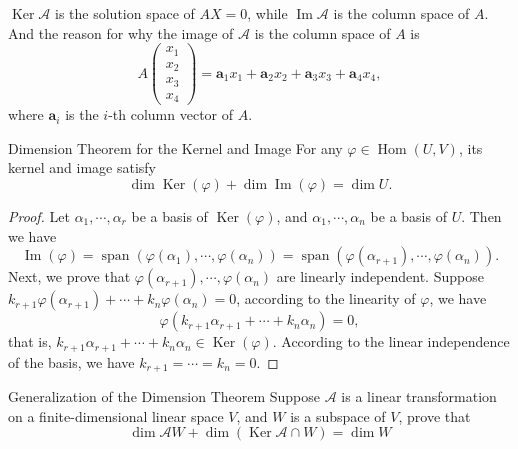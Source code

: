 \begin{solution}
  $\operatorname{Ker} \mathcal{A}$ is the solution space of $AX = 0$,
  while $\operatorname{Im} \mathcal{A}$ is the column space of $A$.
  And the reason for why the image of $\mathcal{A}$ is the column space of $A$ is
  \begin{equation}
    A \left(
      \begin{array}{c}
        x_1\\
        x_2\\
        x_3\\
        x_4
      \end{array}
    \right) = \mathbf{a}_1x_1 + \mathbf{a}_2x_2 + \mathbf{a}_3x_3 + \mathbf{a}_4x_4,
  \end{equation}
  where $\mathbf{a}_i$ is the $i$-th column vector of $A$.
\end{solution}

\begin{theorem}{Dimension Theorem for the Kernel and Image}{}
  For any $\varphi \in \operatorname{Hom}(U, V)$,
  its kernel and image satisfy
  \begin{equation}
    \dim \operatorname{Ker} (\varphi) + \dim \operatorname{Im} (\varphi)
    = \dim U.
  \end{equation}
\end{theorem}

\begin{proof}
  Let $\alpha_1,\cdots,\alpha_r$ be a basis of $\operatorname{Ker}(\varphi)$,
  and $\alpha_1,\cdots,\alpha_n$ be a basis of $U$.
  Then we have
  \begin{equation}
    \operatorname{Im}(\varphi) = \operatorname{span}(\varphi(\alpha_1),\cdots,\varphi(\alpha_n))
    = \operatorname{span}(\varphi(\alpha_{r+1}),\cdots,\varphi(\alpha_n)).
  \end{equation}
  Next, we prove that $\varphi(\alpha_{r+1}),\cdots,\varphi(\alpha_n)$ are
  linearly independent.
  Suppose $k_{r+1}\varphi(\alpha_{r+1}) + \cdots + k_n \varphi(\alpha_n) = 0$,
  according to the linearity of $\varphi$, we have
  \begin{equation}
    \varphi(k_{r+1}\alpha_{r+1} + \cdots + k_n\alpha_n) = 0,
  \end{equation}
  that is, $k_{r+1}\alpha_{r+1} + \cdots + k_n \alpha_n \in \operatorname{Ker}(\varphi)$.
  According to the linear independence of the basis,
  we have $k_{r+1} = \cdots = k_n = 0$.
\end{proof}

\begin{example}{Generalization of the Dimension Theorem}{}
  Suppose $\mathcal{A}$ is a linear transformation on a finite-dimensional
  linear space $V$,
  and $W$ is a subspace of $V$, prove that
  \begin{equation}
    \dim \mathcal{A} W + \dim (\operatorname{Ker} \mathcal{A} \cap W) = \dim W
  \end{equation}
\end{example}

